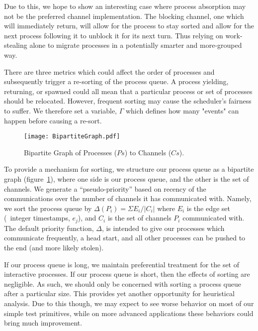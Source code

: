 Due to this, we hope to show an interesting case where process absorption may 
not be the preferred channel implementation. The blocking channel, one which will
immediately return, will allow for the process to stay sorted and allow for the 
next process following it to unblock it for its next turn. Thus relying on 
work-stealing alone to migrate processes in a potentially smarter and 
more-grouped way.

There are three metrics which could affect the order of processes and
subsequently trigger a re-sorting of the process queue. A process yielding,
returning, or spawned could all mean that a particular process or set of
processes should be relocated. However, frequent sorting may cause the
scheduler's fairness to suffer. We therefore set a variable, $\Gamma$ which
defines how many "events" can happen before causing a re-sort.

\begin{figure}
    \centering
    \texttt{[image: BipartiteGraph.pdf]}
    \caption{Bipartite Graph of Processes ($Ps$) to Channels ($Cs$).}
    \label{fig:bipartite-graph}
\end{figure}

To provide a mechanism for sorting, we structure our process queue as a bipartite 
graph (figure~\ref{fig:bipartite-graph}), where one side is our process queue, 
and the other is the set of channels.
We generate a ``pseudo-priority'' based on recency of the communications over
the number of channels it has communicated with. Namely, we sort the process queue
by $\Delta(P_i) = \Sigma E_i / |C_i|$ where $E_i$ is the edge set (\ie~integer timestamps, $e_j$),
and $C_i$ is the set of channels $P_i$ communicated with. The default priority function, $\Delta$,
is intended to give our processes which communicate frequently, a head start, and
all other processes can be pushed to the end (and more likely stolen). 

If our process queue is long, we maintain preferential treatment for the set of 
interactive processes. If our process queue is short, then the effects of 
sorting are negligible. As such, we should only be concerned with sorting a
process queue after a particular size. This provides yet another opportunity for
heuristical analysis. Due to this though, we may expect to see worse behavior
on most of our simple test primitives, while on more advanced applications
these behaviors could bring much improvement.

